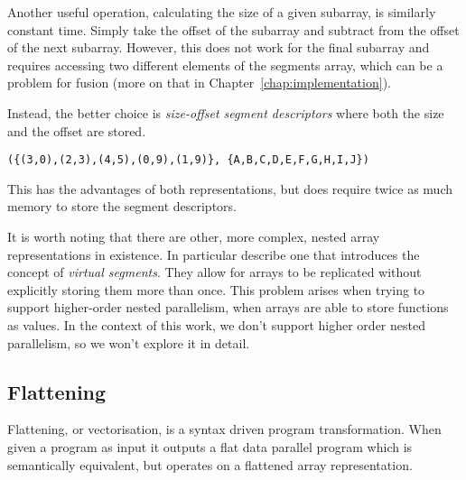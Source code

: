Another useful operation, calculating the size of a given subarray, is similarly constant time. Simply take the offset of the subarray and subtract from the offset of the next subarray. However, this does not work for the final subarray and requires accessing two different elements of the segments array, which can be a problem for fusion (more on that in Chapter~\ref{chap:implementation}).

Instead, the better choice is \emph{size-offset segment descriptors} where both the size and the offset are stored.
%
\begin{lstlisting}
({(3,0),(2,3),(4,5),(0,9),(1,9)}, {A,B,C,D,E,F,G,H,I,J})
\end{lstlisting}
%
This has the advantages of both representations, but does require twice as much memory to store the segment descriptors.


It is worth noting that there are other, more complex, nested array representations in existence. In particular \citet{Lippmeier:replicate} describe one that introduces the concept of \emph{virtual segments}. They allow for arrays to be replicated without explicitly storing them more than once. This problem arises when trying to support higher-order nested parallelism, when arrays are able to store functions as values. In the context of this work, we don't support higher order nested parallelism, so we won't explore it in detail.

\subsection{Flattening}

Flattening, or vectorisation, is a syntax driven program transformation. When given a program as input it outputs a flat data parallel program which is semantically equivalent, but operates on a flattened array representation.

